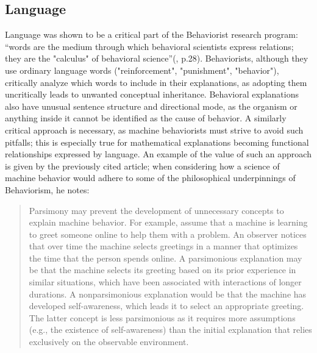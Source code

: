 \documentclass[letterpaper,11pt,twocolumn]{article}
\begin{document}
\subsection*{Language}
Language was shown to be a critical part of the Behaviorist research program: \enquote{words are the medium through which behavioral scientists express relations; they are the "calculus" of behavioral science}(\cite{chiesaRadicalBehaviorismPhilosophy1994}, p.28). Behaviorists, although they use ordinary language words ("reinforcement", "punishment", "behavior"), critically analyze which words to include in their explanations, as adopting them uncritically leads to unwanted conceptual inheritance. Behavioral explanations also have unusual sentence structure and directional mode, as the organism or anything inside it cannot be identified as the cause of behavior. A similarly critical approach is necessary, as machine behaviorists must strive to avoid such pitfalls; this is especially true for mathematical explanations becoming functional relationships expressed by language. An example of the value of such an approach is given by the previously cited article\cite{lanovazCharacteristicsArgumentsFavor2022}; when considering how a science of machine behavior would adhere to some of the philosophical underpinnings of Behaviorism, he notes:
\begin{quotation}
    Parsimony may prevent the development of unnecessary concepts to explain machine behavior. For example, assume that a machine is learning to greet someone online to help them with a problem. An observer notices that over time the machine selects greetings in a manner that optimizes the time that the person spends online. A parsimonious explanation may be that the machine selects its greeting based on its prior experience in similar situations, which have been associated with interactions of longer durations. A nonparsimonious explanation would be that the machine has developed self-awareness, which leads it to select an appropriate greeting. The latter concept is less parsimonious as it requires more assumptions (e.g., the existence of self-awareness) than the initial explanation that relies exclusively on the observable environment.
\end{quotation}
\end{document}
